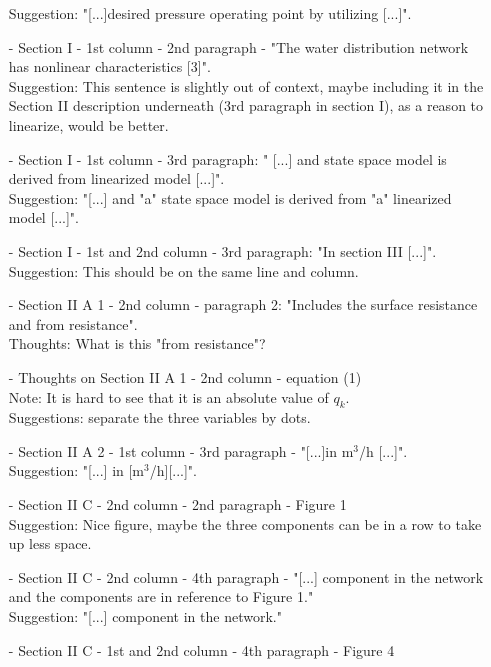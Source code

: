 \begin{itemize}
Suggestion: "[...]desired pressure operating point by utilizing [...]".\\
\item[-]Section I - 1st column - 2nd paragraph - "The water distribution network has nonlinear characteristics [3]".\\
Suggestion: This sentence is slightly out of context, maybe including it in the Section II description underneath (3rd paragraph in section I), as a reason to linearize, would be better.\\
\item[-]Section I - 1st column - 3rd paragraph: " [...] and state space model is derived from linearized model [...]".\\
Suggestion: "[...] and "a" state space model is derived from "a" linearized model [...]".\\
\item[-]Section I - 1st and 2nd column - 3rd paragraph: "In section III [...]".\\
Suggestion: This should be on the same line and column.\\
\item[-]Section II A 1 - 2nd column - paragraph 2: "Includes the surface resistance and from resistance".\\
Thoughts: What is this "from resistance"?\\
\item[-]Thoughts on Section II A 1 - 2nd column - equation (1)\\
Note: It is hard to see that it is an absolute value of $q_k$. \\
Suggestions: separate the three variables by dots.\\
\item[-]Section II A 2 - 1st column - 3rd paragraph - "[...]in m$^3$/h [...]".\\
Suggestion: "[...] in [m$^3$/h][...]".\\
\item[-]Section II C - 2nd column - 2nd paragraph - Figure 1\\
Suggestion: Nice figure, maybe the three components can be in a row to take up less space.\\
\item[-]Section II C - 2nd column - 4th paragraph - "[...] component in the network and the components are in reference to Figure 1."\\
Suggestion: "[...] component in the network."\\
\item[-]Section II C - 1st and 2nd column - 4th paragraph - Figure 4\\

\end{itemize}
